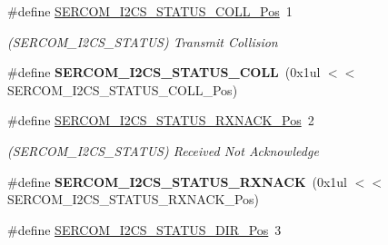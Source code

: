 \begin{DoxyCompactItemize}
\item 
\hypertarget{group___s_a_m_l21___s_e_r_c_o_m_gae79635852dcf1603b0b0a97773e4bfe5}{}\#define \hyperlink{group___s_a_m_l21___s_e_r_c_o_m_gae79635852dcf1603b0b0a97773e4bfe5}{S\+E\+R\+C\+O\+M\+\_\+\+I2\+C\+S\+\_\+\+S\+T\+A\+T\+U\+S\+\_\+\+C\+O\+L\+L\+\_\+\+Pos}~1\label{group___s_a_m_l21___s_e_r_c_o_m_gae79635852dcf1603b0b0a97773e4bfe5}

\begin{DoxyCompactList}\small\item\em (S\+E\+R\+C\+O\+M\+\_\+\+I2\+C\+S\+\_\+\+S\+T\+A\+T\+U\+S) Transmit Collision \end{DoxyCompactList}\item 
\hypertarget{group___s_a_m_l21___s_e_r_c_o_m_gae22da0f3dc57b404ab270a5e1e8fe77b}{}\#define {\bfseries S\+E\+R\+C\+O\+M\+\_\+\+I2\+C\+S\+\_\+\+S\+T\+A\+T\+U\+S\+\_\+\+C\+O\+L\+L}~(0x1ul $<$$<$ S\+E\+R\+C\+O\+M\+\_\+\+I2\+C\+S\+\_\+\+S\+T\+A\+T\+U\+S\+\_\+\+C\+O\+L\+L\+\_\+\+Pos)\label{group___s_a_m_l21___s_e_r_c_o_m_gae22da0f3dc57b404ab270a5e1e8fe77b}

\item 
\hypertarget{group___s_a_m_l21___s_e_r_c_o_m_ga95cafce100483170a0abde961ffae973}{}\#define \hyperlink{group___s_a_m_l21___s_e_r_c_o_m_ga95cafce100483170a0abde961ffae973}{S\+E\+R\+C\+O\+M\+\_\+\+I2\+C\+S\+\_\+\+S\+T\+A\+T\+U\+S\+\_\+\+R\+X\+N\+A\+C\+K\+\_\+\+Pos}~2\label{group___s_a_m_l21___s_e_r_c_o_m_ga95cafce100483170a0abde961ffae973}

\begin{DoxyCompactList}\small\item\em (S\+E\+R\+C\+O\+M\+\_\+\+I2\+C\+S\+\_\+\+S\+T\+A\+T\+U\+S) Received Not Acknowledge \end{DoxyCompactList}\item 
\hypertarget{group___s_a_m_l21___s_e_r_c_o_m_ga99dd1f2ffc17db0ad85bd6fa75786a1a}{}\#define {\bfseries S\+E\+R\+C\+O\+M\+\_\+\+I2\+C\+S\+\_\+\+S\+T\+A\+T\+U\+S\+\_\+\+R\+X\+N\+A\+C\+K}~(0x1ul $<$$<$ S\+E\+R\+C\+O\+M\+\_\+\+I2\+C\+S\+\_\+\+S\+T\+A\+T\+U\+S\+\_\+\+R\+X\+N\+A\+C\+K\+\_\+\+Pos)\label{group___s_a_m_l21___s_e_r_c_o_m_ga99dd1f2ffc17db0ad85bd6fa75786a1a}

\item 
\hypertarget{group___s_a_m_l21___s_e_r_c_o_m_ga1a1443388e0f74338aa35f8e4cfa4665}{}\#define \hyperlink{group___s_a_m_l21___s_e_r_c_o_m_ga1a1443388e0f74338aa35f8e4cfa4665}{S\+E\+R\+C\+O\+M\+\_\+\+I2\+C\+S\+\_\+\+S\+T\+A\+T\+U\+S\+\_\+\+D\+I\+R\+\_\+\+Pos}~3\label{group___s_a_m_l21___s_e_r_c_o_m_ga1a1443388e0f74338aa35f8e4cfa4665}


\end{DoxyCompactItemize}
